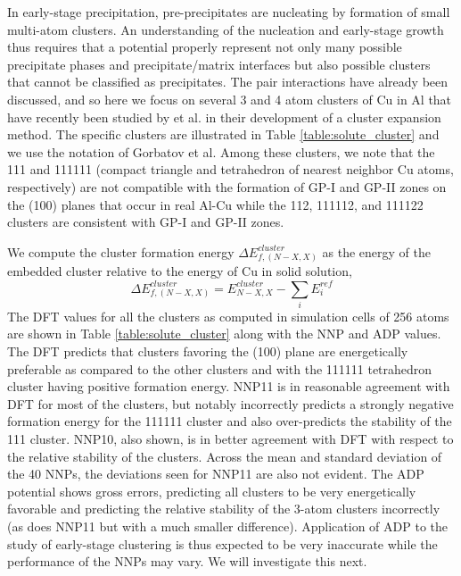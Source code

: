 \documentclass{article}
\begin{document}
In early-stage precipitation, pre-precipitates are nucleating by formation of small multi-atom clusters.  An understanding of the nucleation and early-stage growth thus requires that a potential properly represent not only many possible precipitate phases and precipitate/matrix interfaces but also possible clusters that cannot be classified as precipitates.  The pair interactions have already been discussed, and so here we focus on several 3 and 4 atom clusters of Cu in Al that have recently been studied by \cite{Gorbatov2019EffectiveAlloys} et al. in their development of a cluster expansion method.  The specific clusters are illustrated in Table \ref{table:solute_cluster} and we use the notation of Gorbatov et al.  Among these clusters, we note that the 111 and 111111 (compact triangle and tetrahedron of nearest neighbor Cu atoms, respectively) are not compatible with the formation of GP-I and GP-II zones on the (100) planes that occur in real Al-Cu while the 112, 111112, and 111122 clusters are consistent with GP-I and GP-II zones.

We compute the cluster formation energy $\Delta E^{cluster}_{f,(N-X,X)}$ as the energy of the embedded cluster relative to the energy of Cu in solid solution,
\begin{equation}
\Delta E^{cluster}_{f,(N-X,X)} = E^{cluster}_{N-X,X} - \sum_i E^{ref}_i
\end{equation}
The DFT values for all the clusters as computed in simulation cells of 256 atoms are shown in Table \ref{table:solute_cluster} along with the NNP and ADP values.  The DFT predicts that clusters favoring the (100) plane are energetically preferable as compared to the other clusters and with the 111111 tetrahedron cluster having positive formation energy.  NNP11 is in reasonable agreement with DFT for most of the clusters, but notably incorrectly predicts a strongly negative formation energy for the 111111 cluster and also over-predicts the stability of the 111 cluster.  NNP10, also shown, is in better agreement with DFT with respect to the relative stability of the clusters.  Across the mean and standard deviation of the 40 NNPs, the deviations seen for NNP11 are also not evident.  The ADP potential shows gross errors, predicting all clusters to be very energetically favorable and predicting the relative stability of the 3-atom clusters incorrectly (as does NNP11 but with a much smaller difference).  Application of ADP to the study of early-stage clustering is thus expected to be very inaccurate while the performance of the NNPs may vary.  We will investigate this next.
\end{document}
